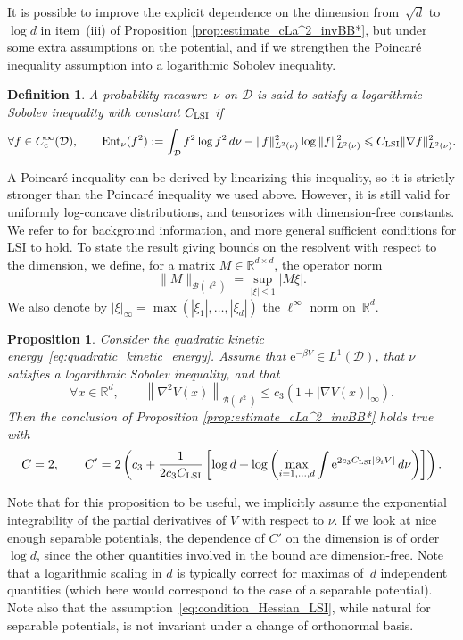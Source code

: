 \documentclass{article}
\newtheorem{definition}{Definition}
\newtheorem{prop}{Proposition}
\newcommand{\rme}{\mathrm{e}}
\newcommand{\cB}{\mathcal{B}}
\newcommand{\cD}{\mathcal{D}}
\newcommand{\R}{\mathbb{R}}
\renewcommand{\leq}{\leqslant}
\begin{document}
It is possible to improve the explicit dependence on the dimension from~$\sqrt{d}$ to~$\log d$ in item~(iii) of Proposition \ref{prop:estimate_cLa^2_invBB*}, but under some extra assumptions on the potential, and if we strengthen the Poincar\'e inequality assumption into a logarithmic Sobolev inequality.

\begin{definition}
A probability measure~$\nu$ on $\cD$ is said to satisfy a logarithmic Sobolev inequality with constant $C_{\rm LSI}$ if 
\[
\forall f \in C_\mathrm{c}^\infty(\cD), \qquad \operatorname{Ent}_{\nu}(f^2) := \int_{\cD} f^2\log f^2 \, d\nu - \|f\|_{L^2(\nu)}^2\log \|f\|_{L^2(\nu)}^2 \leq C_{\rm LSI}\|\nabla f\|_{L^2(\nu)}^2.
\]
\end{definition}

A Poincar\'e inequality can be derived by linearizing this inequality, so it is strictly stronger than the Poincar\'e inequality we used above. However, it is still valid for uniformly log-concave distributions, and tensorizes with dimension-free constants. We refer to \cite{Led99} for background information, and more general sufficient conditions for LSI to hold. To state the result giving bounds on the resolvent with respect to the dimension, we define, for a matrix $M \in \mathbb{R}^{d \times d}$, the operator norm
\[
\|M\|_{\cB(\ell^2)} = \sup_{|\xi| \leq 1} |M\xi|.
\]
We also denote by $|\xi|_\infty = \max(|\xi_1|,\dots,|\xi_d|)$ the $\ell^\infty$ norm on~$\R^d$.

\begin{prop}
  \label{prop:scaling_dimension_Langevin_improved}
  Consider the quadratic kinetic energy~\eqref{eq:quadratic_kinetic_energy}.
  Assume that $\rme^{-\beta V} \in L^1(\cD)$, that $\nu$ satisfies a logarithmic Sobolev inequality, and that 
  \begin{equation}
    \label{eq:condition_Hessian_LSI}
    \forall x \in \R^d, \qquad \left\|\nabla^2V(x)\right\|_{\cB(\ell^2)} \leq c_3\left(1 + |\nabla V(x)|_{\infty}\right).
  \end{equation}
  Then the conclusion of Proposition \ref{prop:estimate_cLa^2_invBB*} holds true with
  \[
    C = 2, \qquad C' = 2\left(c_3 + \frac{1}{2c_3 C_{\rm LSI}}\left[\log d + \log\left( \max_{i=1,\dots,d} \int{\rme^{2c_3 C_{\rm LSI}|\partial_i V|} \, d\nu}\right)\right]\right).
  \]
\end{prop}

Note that for this proposition to be useful, we implicitly assume the exponential integrability of the partial derivatives of $V$ with respect to $\nu$. If we look at nice enough separable potentials, the dependence of $C'$ on the dimension is of order $\log d$, since the other quantities involved in the bound are dimension-free. Note that a logarithmic scaling in $d$ is typically correct for maximas of~$d$ independent quantities \cite[Lemma 2.2]{dev2001} (which here would correspond to the case of a separable potential). Note also that the assumption~\eqref{eq:condition_Hessian_LSI}, while natural for separable potentials, is not invariant under a change of orthonormal basis.
\end{document}
